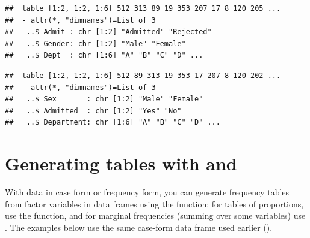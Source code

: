 \documentclass[11pt]{book}
\renewenvironment{knitrout}{\small\renewcommand{\baselinestretch}{.85}}{} %
\begin{document}
\begin{knitrout}
\color{fgcolor}\begin{kframe}
\begin{alltt}
\end{alltt}
\begin{verbatim}
##  table [1:2, 1:2, 1:6] 512 313 89 19 353 207 17 8 120 205 ...
##  - attr(*, "dimnames")=List of 3
##   ..$ Admit : chr [1:2] "Admitted" "Rejected"
##   ..$ Gender: chr [1:2] "Male" "Female"
##   ..$ Dept  : chr [1:6] "A" "B" "C" "D" ...
\end{verbatim}
\begin{alltt}
 \hlkwb{<-}  \hlstd{(}\hlstd{,} \hlstd{,} \hlstd{))}
\hlstd{(UCB)[[}\hlstd{]]} \hlkwb{<-} \hlstd{(}\hlstd{,} \hlstd{)}
\hlstd{(} \hlkwb{<-} \hlstd{(}\hlstd{,} \hlstd{,} \hlstd{)}
\end{alltt}
\begin{verbatim}
##  table [1:2, 1:2, 1:6] 512 89 313 19 353 17 207 8 120 202 ...
##  - attr(*, "dimnames")=List of 3
##   ..$ Sex       : chr [1:2] "Male" "Female"
##   ..$ Admitted  : chr [1:2] "Yes" "No"
##   ..$ Department: chr [1:6] "A" "B" "C" "D" ...
\end{verbatim}
\end{kframe}
\end{knitrout}


\section[Generating tables: table and xtabs]{Generating tables with  and }\label{sec:table}

With data in case form or frequency form,
you  can  generate frequency  tables from factor variables in data frames 
using the   function; for  tables  of
proportions,  use  the  function,  and for marginal  frequencies
(summing over some variables) use .  The examples below 
use the same case-form data frame  used earlier ().
\end{document}
